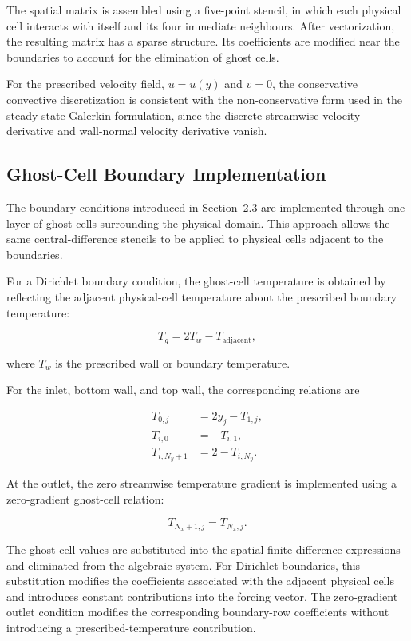 The spatial matrix is assembled using a five-point stencil,
in which each physical cell interacts with itself and its
four immediate neighbours. After vectorization, the resulting
matrix has a sparse structure. Its coefficients are modified
near the boundaries to account for the elimination of ghost
cells.

For the prescribed velocity field, $u=u(y)$ and $v=0$, the
conservative convective discretization is consistent with
the non-conservative form used in the steady-state Galerkin
formulation, since the discrete streamwise velocity derivative
and wall-normal velocity derivative vanish.


\subsection{Ghost-Cell Boundary Implementation}

The boundary conditions introduced in Section~2.3 are
implemented through one layer of ghost cells surrounding
the physical domain. This approach allows the same central-difference
stencils to be applied to physical cells adjacent to the
boundaries.

For a Dirichlet boundary condition, the ghost-cell temperature
is obtained by reflecting the adjacent physical-cell temperature
about the prescribed boundary temperature:

\begin{equation}
    \boxed{
    T_g=2T_w-T_{\mathrm{adjacent}},
    }
    \label{eq:dirichlet_ghost}
\end{equation}

where $T_w$ is the prescribed wall or boundary temperature.

For the inlet, bottom wall, and top wall, the corresponding
relations are

\begin{align}
    T_{0,j}&=2y_j-T_{1,j},\\
    T_{i,0}&=-T_{i,1},\\
    T_{i,N_y+1}&=2-T_{i,N_y}.
\end{align}

At the outlet, the zero streamwise temperature gradient is
implemented using a zero-gradient ghost-cell relation:

\begin{equation}
    \boxed{
    T_{N_x+1,j}=T_{N_x,j}.
    }
    \label{eq:neumann_ghost}
\end{equation}

The ghost-cell values are substituted into the spatial
finite-difference expressions and eliminated from the
algebraic system. For Dirichlet boundaries, this substitution
modifies the coefficients associated with the adjacent
physical cells and introduces constant contributions into
the forcing vector. The zero-gradient outlet condition
modifies the corresponding boundary-row coefficients
without introducing a prescribed-temperature contribution.

